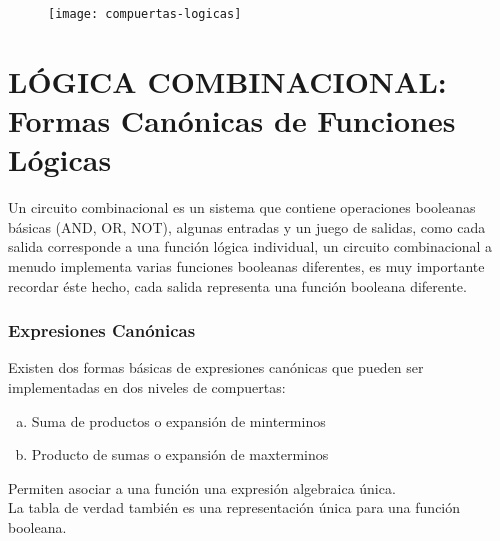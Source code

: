 \documentclass{article}
\begin{document}
        \begin{figure}[htp]
        \centering
        \texttt{[image: compuertas-logicas]}
        \end{figure}
    \newpage
    \part{LÓGICA COMBINACIONAL: Formas Canónicas de Funciones Lógicas}
        Un circuito combinacional es un sistema que contiene operaciones booleanas básicas (AND, OR, NOT), algunas entradas y un juego de salidas, como cada salida corresponde a una función lógica individual, un circuito combinacional a menudo implementa varias funciones booleanas diferentes, es muy importante recordar éste hecho, cada salida representa una función booleana diferente.\\
        \section{\large\textbf{Expresiones Canónicas}}
            Existen dos formas básicas de expresiones canónicas que pueden ser implementadas en dos niveles de compuertas:
            \begin{enumerate}[a)]
            \item Suma de productos o expansión de minterminos
            \item Producto de sumas o expansión de maxterminos
            \end{enumerate}
            Permiten asociar a una función una expresión algebraica única.\\
            La tabla de verdad también es una representación única para una función booleana.\\
\end{document}
